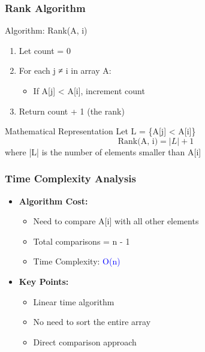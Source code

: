\begin{frame}
    \frametitle{Rank Algorithm}
    \begin{block}{Algorithm: Rank(A, i)}
        \begin{enumerate}
            \item Let count = 0
            \item For each j ≠ i in array A:
                \begin{itemize}
                    \item If A[j] < A[i], increment count
                \end{itemize}
            \item Return count + 1 (the rank)
        \end{enumerate}
    \end{block}
    
    \begin{alertblock}{Mathematical Representation}
        Let L = \{A[j] < A[i]\}
        \[
        \text{Rank(A, i)} = |L| + 1
        \]
        where |L| is the number of elements smaller than A[i]
    \end{alertblock}
\end{frame}

\begin{frame}
    \frametitle{Time Complexity Analysis}
    \begin{itemize}
        \item \textbf{Algorithm Cost:}
        \begin{itemize}
            \item Need to compare A[i] with all other elements
            \item Total comparisons = n - 1
            \item Time Complexity: \textcolor{blue}{O(n)}
        \end{itemize}
        \vspace{0.3cm}
        \item \textbf{Key Points:}
        \begin{itemize}
            \item Linear time algorithm
            \item No need to sort the entire array
            \item Direct comparison approach
        \end{itemize}
    \end{itemize}
\end{frame}



